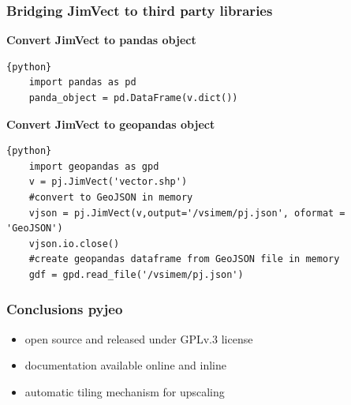 \documentclass[11pt, handout, aspectratio=169]{beamer}
\begin{document}
\begin{frame}[fragile]
  \frametitle{Bridging JimVect to third party libraries}
  \textbf{Convert JimVect to pandas object}
  \begin{lstlisting}{python}
    import pandas as pd
    panda_object = pd.DataFrame(v.dict())
  \end{lstlisting}
  \textbf{Convert JimVect to geopandas object}
  \begin{lstlisting}{python}
    import geopandas as gpd
    v = pj.JimVect('vector.shp')
    #convert to GeoJSON in memory
    vjson = pj.JimVect(v,output='/vsimem/pj.json', oformat = 'GeoJSON')
    vjson.io.close()
    #create geopandas dataframe from GeoJSON file in memory
    gdf = gpd.read_file('/vsimem/pj.json')
  \end{lstlisting}
\end{frame}

\begin{frame}
 \frametitle{Conclusions pyjeo}
 \begin{itemize}
 \item open source and released under GPLv.3 license
 \item documentation available online and inline
 \item automatic tiling mechanism for upscaling
 \end{itemize}
	
\end{frame}


\ThankYouFrame

%
\end{document}
